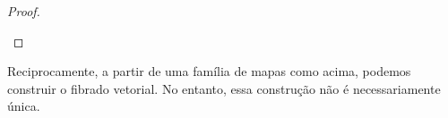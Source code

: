 \begin{proof}
\begin{enumerate}
\begin{comment}
\begin{comment}
Como $(h' \circ h\inv) \circ (h \circ {h'}\inv) = \Id$ e $(h \circ {h'}\inv) \circ (h' \circ h\inv)= \Id$, segue que, para todo $v \in \R^n$,
		\begin{align*}
		(p,v) &= (h' \circ h\inv) \circ (h \circ {h'}\inv) (p,v) \\
			&= h' \circ h\inv(p,T^{h'}_h|_p(v)) \\
			&= (p,(T^h_{h'}|_p \circ T^{h'}_h|_p) (v))
		\end{align*}
e
		\begin{align*}
		(p,v) &= (h \circ {h'}\inv) \circ (h' \circ h\inv) (p,v) \\
			&= h \circ {h'}\inv(p,T^h_{h'}|_p(v)) \\
			&= (p,(T^{h'}_h|_p \circ T^h_{h'}|_p) (v)),
		\end{align*}
o que mostra que
		\begin{equation*}
		v = (T^h_{h'}|_p \circ T^{h'}_h|_p) (v) = (T^{h'}_h|_p \circ T^h_{h'}|_p) (v),
		\end{equation*}
logo ${T^h_{h'}|_p}\inv = T^{h'}_h|_p$.
\end{comment}
	\end{enumerate}
\end{proof}

Reciprocamente, a partir de uma família de mapas como acima, podemos construir o fibrado vetorial. No entanto, essa construção não é necessariamente única.

